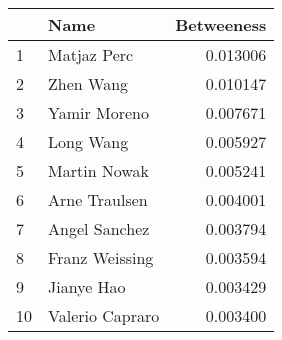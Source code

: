 \begin{tabular}{llr}
\toprule
{} &             Name &  Betweeness \\
\midrule
1  &      Matjaz Perc &    0.013006 \\
2  &        Zhen Wang &    0.010147 \\
3  &     Yamir Moreno &    0.007671 \\
4  &        Long Wang &    0.005927 \\
5  &     Martin Nowak &    0.005241 \\
6  &    Arne Traulsen &    0.004001 \\
7  &    Angel Sanchez &    0.003794 \\
8  &   Franz Weissing &    0.003594 \\
9  &       Jianye Hao &    0.003429 \\
10 &  Valerio Capraro &    0.003400 \\
\bottomrule
\end{tabular}
